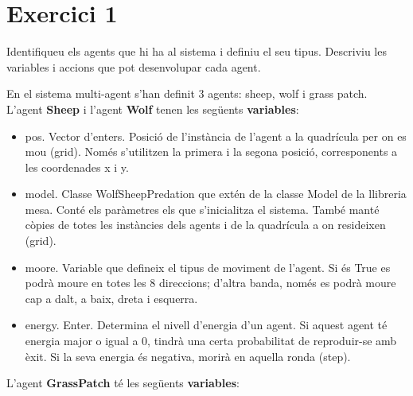 \documentclass{article} %
\begin{document}
\section{Exercici 1}
Identifiqueu els agents que hi ha al sistema i definiu el seu tipus. Descriviu les variables i accions que pot desenvolupar cada agent. \\

{\color{blue}
	
	En el sistema multi-agent s'han definit 3 agents: sheep, wolf i grass patch. \\

	L'agent \textbf{Sheep} i l'agent \textbf{Wolf} tenen les següents \textbf{variables}:

	\begin{itemize}
		\item{
			{\selectfont\small pos}. Vector d'enters. Posició de l'instància de l'agent a la quadrícula per on es mou (grid). Només s'utilitzen la primera i la segona posició, corresponents a les coordenades x i y.
		}
		\item{
			{\selectfont\small model}. Classe {\selectfont\small WolfSheepPredation} que extén de la classe {\selectfont\small Model} de la llibreria mesa. Conté els paràmetres els que s'inicialitza el sistema. També manté còpies de totes les instàncies dels agents i de la quadrícula a on resideixen (grid).
		}
		\item{
			{\selectfont\small moore}. Variable que defineix el tipus de moviment de l'agent. Si és {\selectfont\small True} es podrà moure en totes les 8 direccions; d'altra banda, només es podrà moure cap a dalt, a baix, dreta i esquerra.
		}
		\item{
			{\selectfont\small energy}. Enter. Determina el nivell d'energia d'un agent. Si aquest agent té energia major o igual a 0, tindrà una certa probabilitat de reproduir-se amb èxit. Si la seva energia és negativa, morirà en aquella ronda (step).
		}
	\end{itemize}

	L'agent \textbf{GrassPatch} té les següents \textbf{variables}:

}
\end{document}
